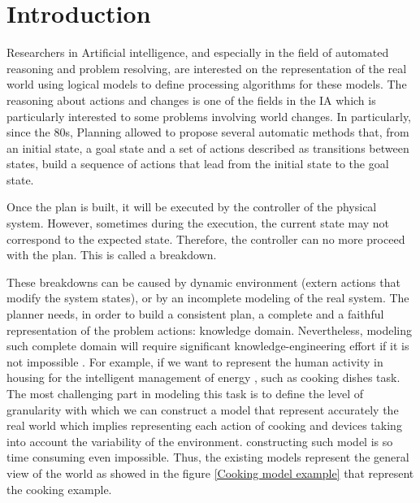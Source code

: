 
\chapter{Introduction} %

\label{Chapter 1} %



Researchers in Artificial intelligence, and especially in the field of automated reasoning and problem resolving, are interested on the representation of the real world using logical models to define processing algorithms for these models. The reasoning about actions and changes is one of the fields in the IA which is particularly interested to some problems involving world changes. In particularly, since the 80s, Planning allowed to propose several automatic methods that, from an initial state, a goal state and a set of actions described as transitions between states, build a sequence of actions that lead from the initial state to the goal state.
\par Once the plan is built, it will be executed by the controller of the physical system. However, sometimes during the execution, the current state may not correspond to the expected state. Therefore, the controller can no more proceed with the plan. This is called a breakdown.

These breakdowns can be caused by dynamic environment (extern actions that modify the system states), or by an incomplete modeling of the real system. The planner needs, in order to build a consistent plan, a complete and a faithful representation of the problem actions: knowledge domain. 
Nevertheless, modeling such complete domain will require significant knowledge-engineering effort if it is not impossible \cite{gil1992acquiring}. For example, if we want to represent the human activity in housing for the intelligent management of energy \cite{hurauxmodele}, such as cooking dishes task. The most challenging part in  modeling this task is to define the level of granularity with which we can construct a model that represent  accurately  the real world which implies representing each  action of cooking and devices taking into account the variability of the environment. constructing such model is so time consuming even impossible. Thus, the existing models represent the general view of the world as showed in the figure \ref{Cooking model example} that represent the cooking example.

